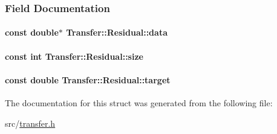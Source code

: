 \subsubsection{\-Field \-Documentation}
\hypertarget{structTransfer_1_1Residual_a1bd9651af31350c6086ac3d20f694a73}{
\paragraph[{data}]{\setlength{\rightskip}{0pt plus 5cm}const double$\ast$ {\bf \-Transfer\-::\-Residual\-::data}}}\label{structTransfer_1_1Residual_a1bd9651af31350c6086ac3d20f694a73}
\hypertarget{structTransfer_1_1Residual_a146501e7157821b956151e8aad19eceb}{
\paragraph[{size}]{\setlength{\rightskip}{0pt plus 5cm}const int {\bf \-Transfer\-::\-Residual\-::size}}}\label{structTransfer_1_1Residual_a146501e7157821b956151e8aad19eceb}
\hypertarget{structTransfer_1_1Residual_a8e3dd4e4c95eac5b152618360bab2a15}{
\paragraph[{target}]{\setlength{\rightskip}{0pt plus 5cm}const double {\bf \-Transfer\-::\-Residual\-::target}}}\label{structTransfer_1_1Residual_a8e3dd4e4c95eac5b152618360bab2a15}


\-The documentation for this struct was generated from the following file\-:\begin{DoxyCompactItemize}
\item 
src/\hyperlink{transfer_8h}{transfer.\-h}\end{DoxyCompactItemize}
